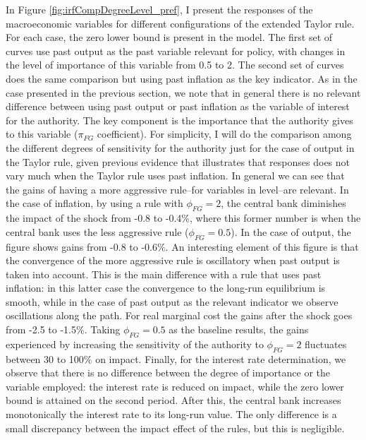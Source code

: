 \documentclass[12pt]{article}
\numberwithin{equation}{section}
\begin{document}
In Figure \ref{fig:irfCompDegreeLevel_pref}, I present the responses of the macroeconomic variables for different configurations of the extended Taylor rule. For each case, the zero lower bound is present in the model. The first set of curves use past output as the past variable relevant for policy, with changes in the level of importance of this variable from 0.5 to 2. The second set of curves does the same comparison but using past inflation as the key indicator. As in the case presented in the previous section, we note that in general there is no relevant difference between using past output or past inflation as the variable of interest for the authority. The key component is the importance that the authority gives to this variable ($\pi_{FG}$ coefficient). For simplicity, I will do the comparison among the different degrees of sensitivity for the authority just for the case of output in the Taylor rule, given previous evidence that illustrates that responses does not vary much when the Taylor rule uses past inflation. In general we can see that the gains of having a more aggressive rule--for variables in level--are relevant. In the case of inflation, by using a rule with $\phi_{FG}=2$, the central bank diminishes the impact of the shock from -0.8 to -0.4\%, where this former number is when the central bank uses the less aggressive rule ($\phi_{FG}=0.5$). In the case of output, the figure shows gains from -0.8 to -0.6\%. An interesting element of this figure is that the convergence of the more aggressive rule is oscillatory when past output is taken into account. This is the main difference with a rule that uses past inflation: in this latter case the convergence to the long-run equilibrium is smooth, while in the case of past output as the relevant indicator we observe oscillations along the path. For real marginal cost the gains after the shock goes from -2.5 to -1.5\%. Taking $\phi_{FG}=0.5$ as the baseline results, the gains experienced by increasing the sensitivity of the authority to $\phi_{FG}=2$ fluctuates between 30 to 100\% on impact. Finally, for the interest rate determination, we observe that there is no difference between the degree of importance or the variable employed: the interest rate is reduced on impact, while the zero lower bound is attained on the second period. After this, the central bank increases monotonically the interest rate to its long-run value. The only difference is a small discrepancy between the impact effect of the rules, but this is negligible.

\end{document}

